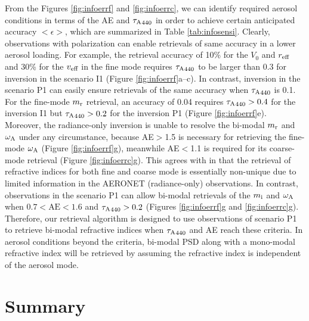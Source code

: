 From the Figures \ref{fig:infoerrf} and \ref{fig:infoerrc}, we can identify 
required aerosol conditions in terms of the AE and ${\tau_\text{A}}_{440}$ in order
to achieve certain anticipated accuracy $<\epsilon>$, which are summarized
in Table \ref{tab:infosensi}. Clearly, observations with polarization can enable 
retrievals of same accuracy in a lower aerosol loading. For example, the 
retrieval accuracy of 10\% for the $V_0$ and $r_\text{eff}$ and 30\% for the
$v_\text{eff}$ in the fine mode requires ${\tau_\text{A}}_{440}$ to be larger than 0.3 for 
inversion in the scenario I1 (Figure \ref{fig:infoerrf}a--c). In
contrast, inversion in the scenario P1 can easily ensure retrievals of
the same accuracy when ${\tau_\text{A}}_{440}$ is 0.1. For the fine-mode
$m_\text{r}$ retrieval, an accuracy of 0.04 requires ${\tau_\text{A}}_{440}>0.4$ for the
inversion I1 but ${\tau_\text{A}}_{440}>0.2$ for the inversion P1 (Figure
\ref{fig:infoerrf}e). Moreover, the radiance-only inversion
is unable to resolve the bi-modal $m_\text{r}$ and $\omega_\text{A}$ under any circumstance,
because AE$>$1.5 is necessary for retrieving the fine-mode $\omega_\text{A}$
(Figure \ref{fig:infoerrf}g), meanwhile AE$<$1.1 is required for its 
coarse-mode retrieval (Figure \ref{fig:infoerrc}g). This agrees with 
\citet{Dubovik00b} in that the retrieval of refractive indices for both fine
and coarse mode is essentially non-unique due to limited information in the
AERONET (radiance-only) observations. In contrast, observations in the
scenario P1 can allow bi-modal retrievals of the $m_\text{i}$ and $\omega_\text{A}$ when 
$0.7<\text{AE}<1.6$ and ${\tau_\text{A}}_{440}>0.2$ (Figures \ref{fig:infoerrf}g
and \ref{fig:infoerrc}g). Therefore, our retrieval algorithm is designed
to use observations of scenario P1 to retrieve bi-modal refractive indices 
when ${\tau_\text{A}}_{440}$ and AE reach these criteria. In aerosol conditions beyond
the criteria, bi-modal PSD along with a mono-modal refractive index will be 
retrieved by assuming the refractive index is independent of the aerosol mode.

\section{Summary} \label{sec:infosummary}

